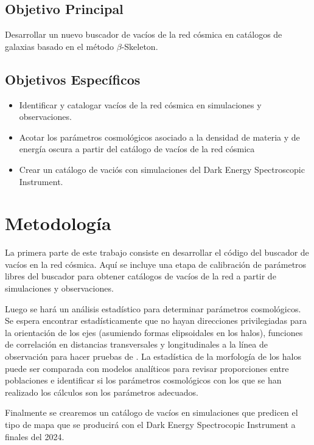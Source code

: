 \documentclass[preprint]{aastex62}
\begin{document}
  \subsection{Objetivo Principal}
  Desarrollar un nuevo buscador de vacíos de la red cósmica en catálogos de galaxias
  basado en el método $\beta$-Skeleton.
  
  \subsection{Objetivos Específicos}

  \begin{itemize}    
      \item Identificar y catalogar vacíos de la red cósmica en
        simulaciones y observaciones.
      \item Acotar los parámetros cosmológicos asociado a la densidad
        de materia y de energía oscura a partir del catálogo de
        vacíos de la red cósmica
    \item  Crear un cat\'alogo de vaci\'os con simulaciones del Dark
      Energy Spectroscopic Instrument.
  \end{itemize}
  
  \section{Metodología}

  La primera parte de este trabajo consiste en desarrollar el código del buscador de vacíos
  en la red cósmica. Aquí se incluye una etapa de calibración de parámetros libres del buscador
  para obtener catálogos de vacíos de la red a partir de simulaciones y observaciones.
   
  Luego se hará un análisis estadístico para determinar parámetros cosmológicos.
  Se espera encontrar estadísticamente que no hayan direcciones privilegiadas para la orientación
  de los ejes (asumiendo formas elipsoidales en los halos), funciones de correlación en distancias
  transversales y longitudinales a la línea de observación para hacer pruebas de
  \citet{AlcockPaczynski1979}. La estadística de la morfología de los halos puede ser comparada
  con modelos analíticos para revisar proporciones entre poblaciones e identificar si los
  parámetros cosmológicos con los que se han realizado los cálculos son los parámetros adecuados.
  
  Finalmente se crearemos un cat\'alogo de vac\'ios en simulaciones
  que predicen el tipo de mapa que se producir\'a con el Dark Energy
  Spectrocopic Instrument a finales del 2024. 
\end{document}
